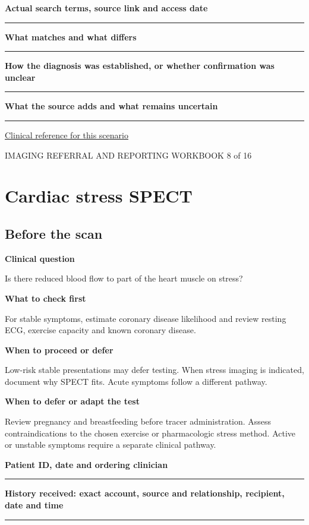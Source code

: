 \documentclass[11pt,a4paper]{article}
\newcommand{\record}[1]{\textbf{#1}\par\vspace{0.55\baselineskip}\hrule\vspace{0.35\baselineskip}}
\begin{document}
\record{Actual search terms, source link and access date}

\record{What matches and what differs}

\record{How the diagnosis was established, or whether confirmation was unclear}

\record{What the source adds and what remains uncertain}

\small\href{https://pmc.ncbi.nlm.nih.gov/articles/12165998/}{Clinical reference for this scenario}

\normalsize

\newpage

{\small IMAGING REFERRAL AND REPORTING WORKBOOK \hfill 8 of 16}

\section*{Cardiac stress SPECT}

\subsection*{Before the scan}

\textbf{Clinical question}\par Is there reduced blood flow to part of the heart muscle on stress?\par

\textbf{What to check first}\par For stable symptoms, estimate coronary disease likelihood and review resting ECG, exercise capacity and known coronary disease.\par

\textbf{When to proceed or defer}\par Low-risk stable presentations may defer testing. When stress imaging is indicated, document why SPECT fits. Acute symptoms follow a different pathway.\par

\textbf{When to defer or adapt the test}\par Review pregnancy and breastfeeding before tracer administration. Assess contraindications to the chosen exercise or pharmacologic stress method. Active or unstable symptoms require a separate clinical pathway.\par

\record{Patient ID, date and ordering clinician}

\record{History received: exact account, source and relationship, recipient, date and time}
\end{document}

